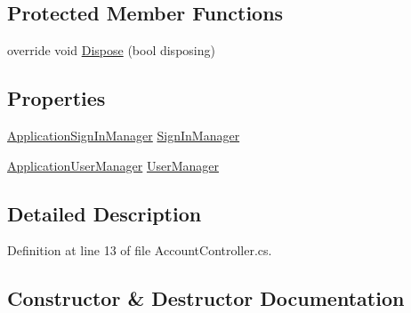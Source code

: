 \subsection*{Protected Member Functions}
\begin{DoxyCompactItemize}
\item 
override void \mbox{\hyperlink{class_brew_day2_1_1_controllers_1_1_account_controller_a70375e7a1aa3e246515cbfcc330df4ce}{Dispose}} (bool disposing)
\end{DoxyCompactItemize}
\subsection*{Properties}
\begin{DoxyCompactItemize}
\item 
\mbox{\hyperlink{class_brew_day2_1_1_application_sign_in_manager}{Application\+Sign\+In\+Manager}} \mbox{\hyperlink{class_brew_day2_1_1_controllers_1_1_account_controller_acd6a265613fc6816cebeea68d5d7f8ff}{Sign\+In\+Manager}}
\item 
\mbox{\hyperlink{class_brew_day2_1_1_application_user_manager}{Application\+User\+Manager}} \mbox{\hyperlink{class_brew_day2_1_1_controllers_1_1_account_controller_a3b0d883fe8e12fe7b266edac6447e0e8}{User\+Manager}}
\end{DoxyCompactItemize}


\subsection{Detailed Description}


Definition at line 13 of file Account\+Controller.\+cs.



\subsection{Constructor \& Destructor Documentation}
\mbox{\label{class_brew_day2_1_1_controllers_1_1_account_controller_a3754bc6fe622589b24b8c63d1dae507e}} 
